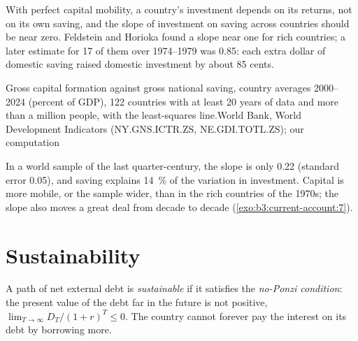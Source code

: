 With perfect capital mobility, a country's investment depends on its returns, not
on its own saving, and the slope of investment on saving across countries should
be near zero. Feldstein and Horioka found a slope near one for rich countries; a
later estimate for 17 of them over 1974--1979 was 0.85: each extra dollar of
domestic saving raised domestic investment by about 85 cents. %

\begin{omchart}{Gross capital formation against gross national saving, country
averages 2000--2024 (percent of GDP), 122 countries with at least 20 years of data and
more than a million people, with the least-squares line.}{World Bank, World
Development Indicators (NY.GNS.ICTR.ZS, NE.GDI.TOTL.ZS); our computation}
\end{omchart}

In a world sample of the last quarter-century, the slope is only 0.22 (standard
error 0.05), and saving explains 14~\% of the variation in investment. Capital is
more mobile, or the sample wider, than in the rich countries of the 1970s; the slope
also moves a great deal from decade to decade (\cref{exo:b3:current-account:7}).

\section{Sustainability}\label{sec:b3:current-account:sustainability}

\begin{definition}\label{def:b3:current-account:sustainability}
A path of net external debt is \emph{sustainable} if it satisfies the
\emph{no-Ponzi condition}: the present value of the debt far in the future is not
positive, $\lim_{T\to\infty} D_T/(1 + r)^T \le 0$. The country cannot forever pay the interest on its
debt by borrowing more.
\end{definition}

